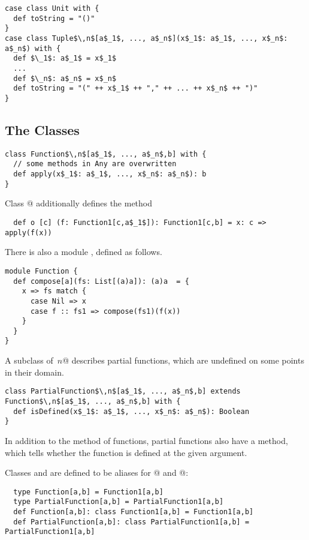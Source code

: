 \documentclass[11pt]{report}
\begin{document}
\begin{itemize}
\begin{verbatim}
case class Unit with {
  def toString = "()"
}
case class Tuple$\,n$[a$_1$, ..., a$_n$](x$_1$: a$_1$, ..., x$_n$: a$_n$) with {
  def $\_1$: a$_1$ = x$_1$
  ...
  def $\_n$: a$_n$ = x$_n$
  def toString = "(" ++ x$_1$ ++ "," ++ ... ++ x$_n$ ++ ")"
}
\end{verbatim}

\subsection{The  Classes}
\label{sec:cls-function}

\begin{verbatim}
class Function$\,n$[a$_1$, ..., a$_n$,b] with {
  // some methods in Any are overwritten
  def apply(x$_1$: a$_1$, ..., x$_n$: a$_n$): b
}
\end{verbatim}
Class @ additionally defines the method
\begin{verbatim}
  def o [c] (f: Function1[c,a$_1$]): Function1[c,b] = x: c => apply(f(x))
\end{verbatim}
There is also a module \verb@Function@, defined as follows.
\begin{verbatim}
module Function {
  def compose[a](fs: List[(a)a]): (a)a  = {
    x => fs match {
      case Nil => x
      case f :: fs1 => compose(fs1)(f(x))
    }
  }
}
\end{verbatim}
A subclass of \verb@Function$\,n$@ describes partial functions, which
are undefined on some points in their domain.

\begin{verbatim}
class PartialFunction$\,n$[a$_1$, ..., a$_n$,b] extends Function$\,n$[a$_1$, ..., a$_n$,b] with {
  def isDefined(x$_1$: a$_1$, ..., x$_n$: a$_n$): Boolean
}
\end{verbatim}

In addition to the \verb@apply@ method of functions, partial functions
also have a \verb@isDefined@ method, which tells whether the function
is defined at the given argument.

Classes \verb@Function@ and \verb@PartialFunction@ are defined to be aliases for
@ and @:
\begin{verbatim}
  type Function[a,b] = Function1[a,b]
  type PartialFunction[a,b] = PartialFunction1[a,b]
  def Function[a,b]: class Function1[a,b] = Function1[a,b]
  def PartialFunction[a,b]: class PartialFunction1[a,b] = PartialFunction1[a,b]
\end{verbatim}


\end{itemize}
\end{document}
